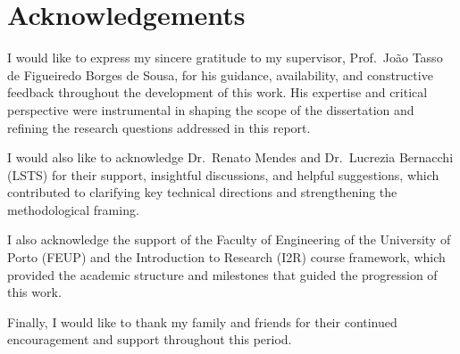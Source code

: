 \chapter*{Acknowledgements}

I would like to express my sincere gratitude to my supervisor, Prof.\ João Tasso de Figueiredo Borges de Sousa, for his guidance, availability, and constructive feedback throughout the development of this work. His expertise and critical perspective were instrumental in shaping the scope of the dissertation and refining the research questions addressed in this report.

I would also like to acknowledge Dr.\ Renato Mendes and Dr.\ Lucrezia Bernacchi (LSTS) for their support, insightful discussions, and helpful suggestions, which contributed to clarifying key technical directions and strengthening the methodological framing.

I also acknowledge the support of the Faculty of Engineering of the University of Porto (FEUP) and the Introduction to Research (I2R) course framework, which provided the academic structure and milestones that guided the progression of this work.

Finally, I would like to thank my family and friends for their continued encouragement and support throughout this period.

\vspace{10mm}

